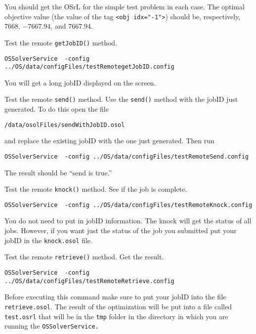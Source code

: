 \begin{itemize}
\begin{itemize}
You should get the OSrL for the simple test problem in each case. The optimal objective value
(the value of the tag {\tt <obj idx="-1">}) should be, respectively, 7668, $-$7667.94, and 7667.94.

\vskip 10pt


 Test the remote {\tt getJobID()} method.


\begin{verbatim}
OSSolverService  -config ../OS/data/configFiles/testRemotegetJobID.config
\end{verbatim}



You will get a long jobID displayed on the screen.


\vskip 10pt


 Test the remote {\tt send()} method. Use the {\tt send()} method with the jobID just  generated.  To do this open the file
\begin{verbatim}
/data/osolFiles/sendWithJobID.osol
\end{verbatim}
and replace the existing jobID with the one just generated.  Then run
\begin{verbatim}
OSSolverService  -config ../OS/data/configFiles/testRemoteSend.config
\end{verbatim}
The result should be ``send is true.''

\vskip 10pt

 Test the remote {\tt knock()} method.  See if the  job is complete.


\begin{verbatim}
OSSolverService  -config ../OS/data/configFiles/testRemoteKnock.config
\end{verbatim}

You do not need to put in jobID information. The knock will get the status of all jobs. However, if you want just the status of the job you submitted put your jobID in the {\tt knock.osol} file. 

\vskip 10pt

 Test the remote {\tt retrieve()} method. Get the result.

\begin{verbatim}
OSSolverService  -config ../OS/data/configFiles/testRemoteRetrieve.config
\end{verbatim}
Before executing this command make sure to put your jobID into the file {\tt retrieve.osol}.  
The result of the optimization will be put into a file called {\tt test.osrl} that will be in the {\tt tmp} folder in the directory in which you are running the {\tt OSSolverService.} 



\end{itemize}
\end{itemize}
